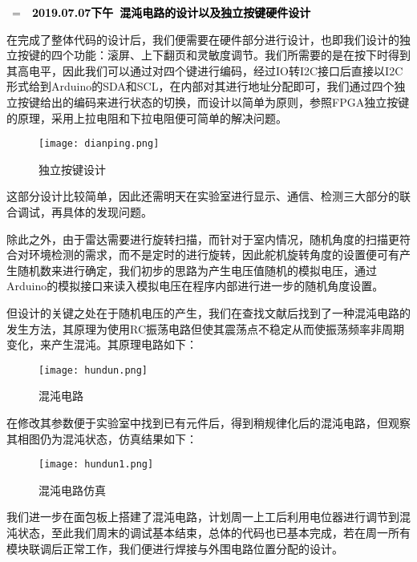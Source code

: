 \documentclass[a4paper, 11pt]{article} %
\makeatletter
\newlength\sidebar
\newlength\envborder
\def\esefcolorbox#1#{\esecolor@fbox{#1}}
\def\esecolor@fbox#1#2#3{%
   \color@b@x{\fboxsep\z@\color#1{#2}\fboxs}{\color#1{#3}}}
\newenvironment{eseframed}{%
   \def\FrameCommand{\fboxrule=\the\sidebar  \fboxsep=\the\envborder%
   \esefcolorbox{exampleborder}{examplebg}}%
   \MakeFramed{\FrameRestore}}%
  {\endMakeFramed}
\newcounter{diary}
\newenvironment{diary}[2]
 {\par\medskip\refstepcounter{diary}%
 \hbox{%
 \fboxsep=\the\sidebar\hspace{-\envborder}\hspace{-0.5\sidebar}%
 \colorbox{exampleborder}{%
 \hspace{\envborder}\footnotesize\sffamily\bfseries%
 \textcolor{black}{{#1}\ {#2}\enspace\hspace{\envborder}}
 }
 }
 \nointerlineskip\vspace{-\topsep}%
 \begin{eseframed}\noindent\ignorespaces%
 }
 {\end{eseframed}\vspace{-\baselineskip}\medskip}
\makeatother
\begin{document}
\begin{diary}{2019.07.07下午}{混沌电路的设计以及独立按键硬件设计}

在完成了整体代码的设计后，我们便需要在硬件部分进行设计，也即我们设计的独立按键的四个功能：滚屏、上下翻页和灵敏度调节。我们所需要的是在按下时得到其高电平，因此我们可以通过对四个键进行编码，经过IO转I2C接口后直接以I2C形式给到Arduino的SDA和SCL，在内部对其进行地址分配即可，我们通过四个独立按键给出的编码来进行状态的切换，而设计以简单为原则，参照FPGA独立按键的原理，采用上拉电阻和下拉电阻便可简单的解决问题。
\begin{figure}[H]
  \centering
  \texttt{[image: dianping.png]}
  \caption{独立按键设计}
\end{figure}

这部分设计比较简单，因此还需明天在实验室进行显示、通信、检测三大部分的联合调试，再具体的发现问题。

除此之外，由于雷达需要进行旋转扫描，而针对于室内情况，随机角度的扫描更符合对环境检测的需求，而不是定时的进行旋转，因此舵机旋转角度的设置便可有产生随机数来进行确定，我们初步的思路为产生电压值随机的模拟电压，通过Arduino的模拟接口来读入模拟电压在程序内部进行进一步的随机角度设置。

但设计的关键之处在于随机电压的产生，我们在查找文献后找到了一种混沌电路的发生方法，其原理为使用RC振荡电路但使其震荡点不稳定从而使振荡频率非周期变化，来产生混沌。其原理电路如下：
\begin{figure}[H]
  \centering
  \texttt{[image: hundun.png]}
  \caption{混沌电路}
\end{figure}

在修改其参数便于实验室中找到已有元件后，得到稍规律化后的混沌电路，但观察其相图仍为混沌状态，仿真结果如下：
\begin{figure}[H]
  \centering
  \texttt{[image: hundun1.png]}
  \caption{混沌电路仿真}
\end{figure}

我们进一步在面包板上搭建了混沌电路，计划周一上工后利用电位器进行调节到混沌状态，至此我们周末的调试基本结束，总体的代码也已基本完成，若在周一所有模块联调后正常工作，我们便进行焊接与外围电路位置分配的设计。
\end{diary}
\end{document}
